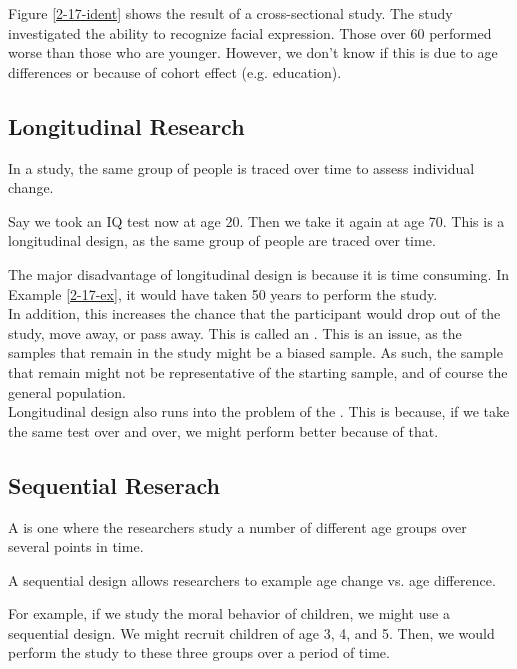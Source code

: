 \documentclass[../main/main.tex]{subfiles}
\begin{document}
\begin{example}
  Figure \ref{2-17-ident} shows the result of a  cross-sectional study.
The study investigated the ability to recognize facial expression. Those over 60 performed worse than those who are younger. However, we don't know if this is due to age differences or because of cohort effect (e.g. education).
\end{example}

\subsection{Longitudinal Research}

\begin{definition}
In a  study, the same group of people is traced over time to assess individual change.
\end{definition}
\begin{example}
Say we took an IQ test now at age 20. Then we take it again at age 70. This is a longitudinal design, as the same group of people are traced over time.
\label{2-17-ex}
\end{example}
\begin{remark}
  The major disadvantage of longitudinal design is because it is time consuming. In Example \ref{2-17-ex}, it would have taken 50 years to perform the study.\\

  In addition, this increases the chance that the participant would drop out of the study, move away, or pass away. This is called an .  This is an issue, as the samples that remain in the study might be a biased sample. As such, the sample that remain might not be representative of the starting sample, and of course the general population.\\

  Longitudinal design also runs into the problem of the . This is because, if we take the same test over and over, we might perform better because of that.

\end{remark}

\subsection{Sequential Reserach}
\begin{definition}
A  is one where the researchers study a number of different age groups over several points in time.
\end{definition}
\begin{remark}
A sequential design allows researchers to example age change vs. age difference.
\end{remark}
\begin{example}
For example, if we study the moral behavior of children, we might use a sequential design. We might recruit children of age 3, 4, and 5. Then, we would perform the study to these three groups over a period of time.
\end{example}
\end{document}
